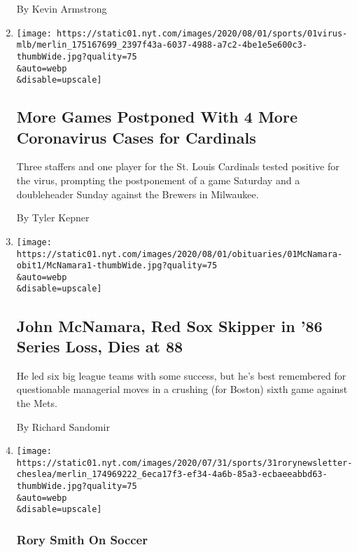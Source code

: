 \begin{enumerate}
  By Kevin Armstrong
\item
  \href{/2020/08/01/sports/baseball/coronavirus-cardinals.html}{}

  \texttt{[image: https://static01.nyt.com/images/2020/08/01/sports/01virus-mlb/merlin\_175167699\_2397f43a-6037-4988-a7c2-4be1e5e600c3-thumbWide.jpg?quality=75\\\&auto=webp\\\&disable=upscale]}

  \hypertarget{more-games-postponed-with-4-more-coronavirus-cases-for-cardinals}{%
  \subsection{More Games Postponed With 4 More Coronavirus Cases for
  Cardinals}\label{more-games-postponed-with-4-more-coronavirus-cases-for-cardinals}}

  Three staffers and one player for the St. Louis Cardinals tested
  positive for the virus, prompting the postponement of a game Saturday
  and a doubleheader Sunday against the Brewers in Milwaukee.

  By Tyler Kepner
\item
  \href{/2020/07/31/sports/baseball/john-mcnamara-dead.html}{}

  \texttt{[image: https://static01.nyt.com/images/2020/08/01/obituaries/01McNamara-obit1/McNamara1-thumbWide.jpg?quality=75\\\&auto=webp\\\&disable=upscale]}

  \hypertarget{john-mcnamara-red-sox-skipper-in-86-series-loss-dies-at-88}{%
  \subsection{John McNamara, Red Sox Skipper in '86 Series Loss, Dies at
  88}\label{john-mcnamara-red-sox-skipper-in-86-series-loss-dies-at-88}}

  He led six big league teams with some success, but he's best
  remembered for questionable managerial moves in a crushing (for
  Boston) sixth game against the Mets.

  By Richard Sandomir
\item
  \href{/2020/07/31/sports/soccer/soccer-baseball.html}{}

  \texttt{[image: https://static01.nyt.com/images/2020/07/31/sports/31rorynewsletter-cheslea/merlin\_174969222\_6eca17f3-ef34-4a6b-85a3-ecbaeeabbd63-thumbWide.jpg?quality=75\\\&auto=webp\\\&disable=upscale]}

  \hypertarget{rory-smith-on-soccer}{%
  \subsubsection{Rory Smith On Soccer}\label{rory-smith-on-soccer}}


\end{enumerate}

